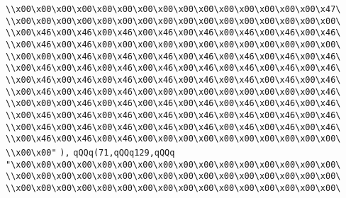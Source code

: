 \verb|\\x00\x00\x00\x00\x00\x00\x00\x00\x00\x00\x00\x00\x00\x00\x00\x47\|\newline
\verb|\\x00\x00\x00\x00\x00\x00\x00\x00\x00\x00\x00\x00\x00\x00\x00\x00\|\newline
\verb|\\x00\x46\x00\x46\x00\x46\x00\x46\x00\x46\x00\x46\x00\x46\x00\x46\|\newline
\verb|\\x00\x46\x00\x46\x00\x00\x00\x00\x00\x00\x00\x00\x00\x00\x00\x00\|\newline
\verb|\\x00\x00\x00\x46\x00\x46\x00\x46\x00\x46\x00\x46\x00\x46\x00\x46\|\newline
\verb|\\x00\x46\x00\x46\x00\x46\x00\x46\x00\x46\x00\x46\x00\x46\x00\x46\|\newline
\verb|\\x00\x46\x00\x46\x00\x46\x00\x46\x00\x46\x00\x46\x00\x46\x00\x46\|\newline
\verb|\\x00\x46\x00\x46\x00\x46\x00\x00\x00\x00\x00\x00\x00\x00\x00\x46\|\newline
\verb|\\x00\x00\x00\x46\x00\x46\x00\x46\x00\x46\x00\x46\x00\x46\x00\x46\|\newline
\verb|\\x00\x46\x00\x46\x00\x46\x00\x46\x00\x46\x00\x46\x00\x46\x00\x46\|\newline
\verb|\\x00\x46\x00\x46\x00\x46\x00\x46\x00\x46\x00\x46\x00\x46\x00\x46\|\newline
\verb|\\x00\x46\x00\x46\x00\x46\x00\x00\x00\x00\x00\x00\x00\x00\x00\x00\|\newline
\verb|\\x00\x00"|\newline
\verb|),|\newline
\verb|qQQq(71,qQQq129,qQQq|\newline
\verb|"\x00\x00\x00\x00\x00\x00\x00\x00\x00\x00\x00\x00\x00\x00\x00\x00\|\newline
\verb|\\x00\x00\x00\x00\x00\x00\x00\x00\x00\x00\x00\x00\x00\x00\x00\x00\|\newline
\verb|\\x00\x00\x00\x00\x00\x00\x00\x00\x00\x00\x00\x00\x00\x00\x00\x00\|\newline
